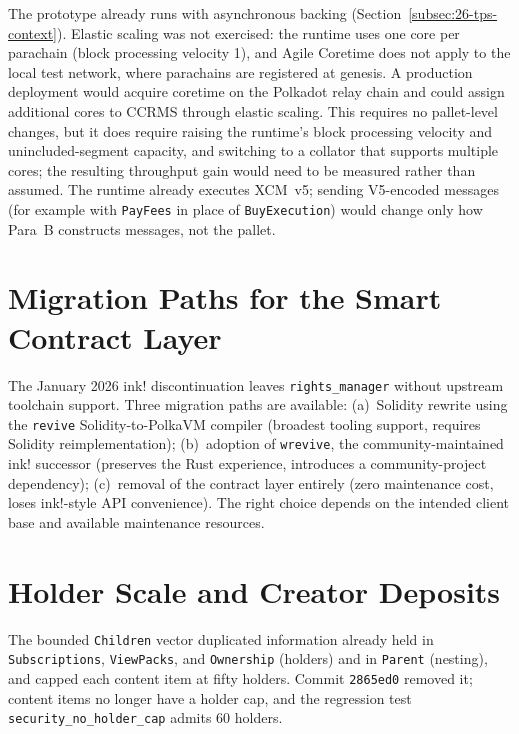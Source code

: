 The prototype already runs with asynchronous backing (Section~\ref{subsec:26-tps-context}). Elastic scaling was not exercised: the runtime uses one core per parachain (block processing velocity 1), and Agile Coretime does not apply to the local test network, where parachains are registered at genesis. A production deployment would acquire coretime on the Polkadot relay chain and could assign additional cores to CCRMS through elastic scaling. This requires no pallet-level changes, but it does require raising the runtime's block processing velocity and unincluded-segment capacity, and switching to a collator that supports multiple cores; the resulting throughput gain would need to be measured rather than assumed. The runtime already executes XCM~v5; sending V5-encoded messages (for example with \texttt{PayFees} in place of \texttt{BuyExecution}) would change only how Para~B constructs messages, not the pallet.

\section{Migration Paths for the Smart Contract Layer}\label{sec:e-contract-migration}

The January 2026 ink! discontinuation leaves \texttt{rights\_manager} without upstream toolchain support. Three migration paths are available: (a)~Solidity rewrite using the \texttt{revive} Solidity-to-PolkaVM compiler (broadest tooling support, requires Solidity reimplementation); (b)~adoption of \texttt{wrevive}, the community-maintained ink! successor (preserves the Rust experience, introduces a community-project dependency); (c)~removal of the contract layer entirely (zero maintenance cost, loses ink!-style API convenience). The right choice depends on the intended client base and available maintenance resources.

\section{Holder Scale and Creator Deposits}\label{sec:e-child-cap}

The bounded \texttt{Children} vector duplicated information already held in \texttt{Subscriptions}, \texttt{ViewPacks}, and \texttt{Ownership} (holders) and in \texttt{Parent} (nesting), and capped each content item at fifty holders. Commit \texttt{2865ed0} removed it; content items no longer have a holder cap, and the regression test \texttt{security\_no\_holder\_cap} admits 60 holders.


